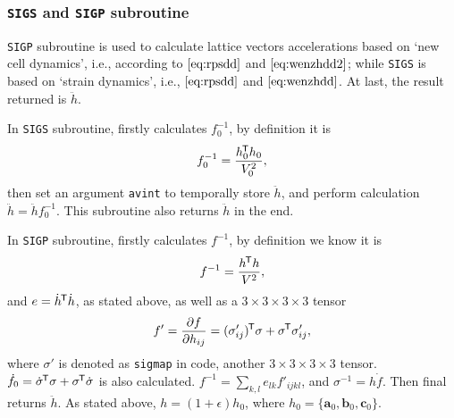 
\subsubsection{\texttt{SIGS} and \texttt{SIGP} subroutine}
\label{sssec:sigs&p}

\texttt{SIGP} subroutine is used to calculate lattice vectors accelerations
based on `new cell dynamics', i.e., according to $\eqref{eq:rpsdd}$ and
$\eqref{eq:wenzhdd2}$; while \texttt{SIGS} is based on `strain dynamics',
i.e., $\eqref{eq:rpsdd}$ and $\eqref{eq:wenzhdd}$.
At last, the result returned is $\ddot{h}$.

In \texttt{SIGS} subroutine,
firstly calculates $f_0^{-1}$, by definition it is
\begin{equation}
	f_0^{-1} = \frac{ h_0 ^{\mkern-1.5mu\mathsf{T}} h_0}{ V_0^2 },
\end{equation}
then set an argument \texttt{avint} to temporally store $\ddot{h}$,
and perform calculation $\ddot{h} = \ddot{h} f_0^{-1}$.
This subroutine also returns $\ddot{h}$ in the end.

In \texttt{SIGP} subroutine,
firstly calculates $f^{-1}$, by definition we know it is
\begin{equation}
	f^{-1} = \frac{ h ^{\mkern-1.5mu\mathsf{T}} h }{ V^2 },
\end{equation}
and $e = \dot{ h }^{\mkern-1.5mu\mathsf{T}} \dot{ h }$, as stated above, as well as
a $3\times 3 \times 3 \times 3$ tensor
\begin{equation}
	f ' = \frac{ \partial f }{ \partial h_{ij} } = (\sigma'_{ij})^{\mkern-1.5mu\mathsf{T}} \sigma
	+ \sigma ^{\mkern-1.5mu\mathsf{T}} \sigma'_{ij},
\end{equation}
where $\sigma'$ is denoted as \texttt{sigmap} in code, another $3\times 3
\times 3 \times 3$ tensor.
$\dot{f}_0 = \dot{ \sigma } ^{\mkern-1.5mu\mathsf{T}} \sigma + \sigma ^{\mkern-1.5mu\mathsf{T}} \dot{ \sigma }$ is
also calculated.
$f^{-1} = \sum_{k, l} e_{lk} f'_{ijkl}$, and $\sigma^{-1} = h \dot{ f }$.
Then final returns $\ddot{h}$. As stated above, $h = (1 + \epsilon) h_0$,
where $h_0 = \{ \bm{a}_0, \bm{b}_0, \bm{c}_0 \}$.
